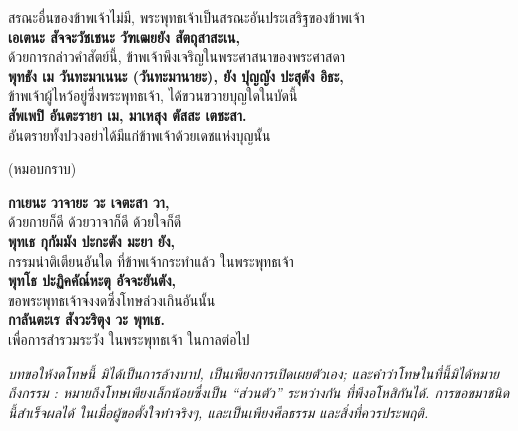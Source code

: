 \documentclass[12pt]{article}
\begin{document}
\indent สรณะอื่นของข้าพเจ้าไม่มี, พระพุทธเจ้าเป็นสรณะอันประเสริฐของข้าพเจ้า\\
\textbf{เอเตนะ สัจจะวัชเชนะ วัฑเฒยยัง สัตถุสาสะเน,}\\
\indent ด้วยการกล่าวคำสัตย์นี้, ข้าพเจ้าพึงเจริญในพระศาสนาของพระศาสดา\\
\textbf{พุทธัง เม วันทะมาเนนะ (วันทะมานายะ), ยัง ปุญญัง ปะสุตัง อิธะ,}\\
\indent ข้าพเจ้าผู้ไหว้อยู่ซึ่งพระพุทธเจ้า, ได้ขวนขวายบุญใดในบัดนี้\\
\textbf{สัพเพปิ อันตะรายา เม, มาเหสุง ตัสสะ เตชะสา.}\\
\indent อันตรายทั้งปวงอย่าได้มีแก่ข้าพเจ้าด้วยเดชแห่งบุญนั้น\\
\begin{center}
(หมอบกราบ)
\end{center}
\textbf{กาเยนะ วาจายะ วะ เจตะสา วา,}\\
\indent ด้วยกายก็ดี ด้วยวาจาก็ดี ด้วยใจก็ดี\\
\textbf{พุทเธ กุกัมมัง ปะกะตัง มะยา ยัง,}\\
\indent กรรมน่าติเตียนอันใด ที่ข้าพเจ้ากระทำแล้ว ในพระพุทธเจ้า\\
\textbf{พุทโธ ปะฏิคคัณ๎หะตุ อัจจะยันตัง,}\\
\indent ขอพระพุทธเจ้าจงงดซึ่งโทษล่วงเกินอันนั้น\\
\textbf{กาลันตะเร สังวะริตุง วะ พุทเธ.}\\
\indent เพื่อการสำรวมระวัง ในพระพุทธเจ้า ในกาลต่อไป\\
\begin{center}
\emph{บทขอให้งดโทษนี้ มิได้เป็นการล้างบาป, เป็นเพียงการเปิดเผยตัวเอง;
และคำว่าโทษในที่นี้มิได้หมายถึงกรรม : หมายถึงโทษเพียงเล็กน้อยซึ่งเป็น “ส่วนตัว” ระหว่างกัน ที่พึงอโหสิกันได้.
การขอขมาชนิดนี้สำเร็จผลได้ ในเมื่อผู้ขอตั้งใจทำจริงๆ, และเป็นเพียงศีลธรรม และสิ่งที่ควรประพฤติ.}
\end{center}
\pagebreak
\end{document}
